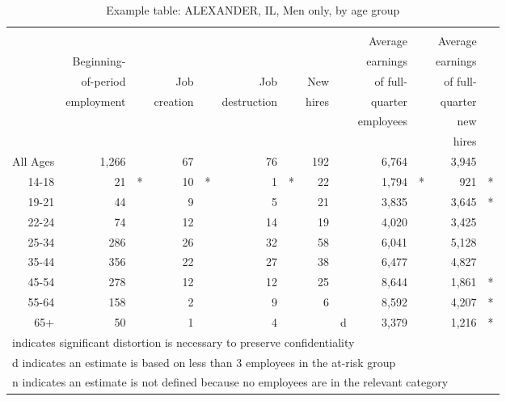 
\begin{table}[htbp]
\small
\begin{center}
  \caption{Example table: ALEXANDER, IL, Men only, by age group}
  \label{tab:table_example}
  \begin{tabular}{rrrrrrrrrrrrr}
\hline
\\[-.3cm]
        &          & &        & &           & &     & & Average & &Average & \\
        &Beginning-& &        & &           & &     & &earnings & &earnings& \\
        &of-period & &  Job   & &    Job    & & New & &of full- & &of full-& \\
        &employment& &creation& &destruction& &hires& & quarter & &quarter & \\
        &          & &        & &           & &     & &employees& &  new   & \\
        &          & &        & &           & &     & &         & & hires  & \\
\hline                                                                        
All Ages&     1,266& &      67& &         76& &  192& &    6,764& &   3,945& \\
14-18   &        21&*&      10&*&          1&*&   22& &    1,794&*&     921&*\\
19-21   &        44& &       9& &          5& &   21& &    3,835& &   3,645&*\\
22-24   &        74& &      12& &         14& &   19& &    4,020& &   3,425& \\
25-34   &       286& &      26& &         32& &   58& &    6,041& &   5,128& \\
35-44   &       356& &      22& &         27& &   38& &    6,477& &   4,827& \\
45-54   &       278& &      12& &         12& &   25& &    8,644& &   1,861&*\\
55-64   &       158& &       2& &          9& &    6& &    8,592& &   4,207&*\\
65+     &        50& &       1& &          4& &     &d&    3,379& &   1,216&*\\
\hline                                                                        
\multicolumn{13}{l}{\footnotesize  * indicates significant distortion   is necessary to preserve confidentiality}\\[-.15cm]
\multicolumn{13}{l}{\footnotesize  d indicates an estimate is based on less
  than 3 employees in the at-risk group}\\[-.15cm]
\multicolumn{13}{l}{\footnotesize  n indicates an estimate is not defined because no employees are in the relevant category}\\[-.15cm]
\end{tabular}
\end{center}
\end{table}

